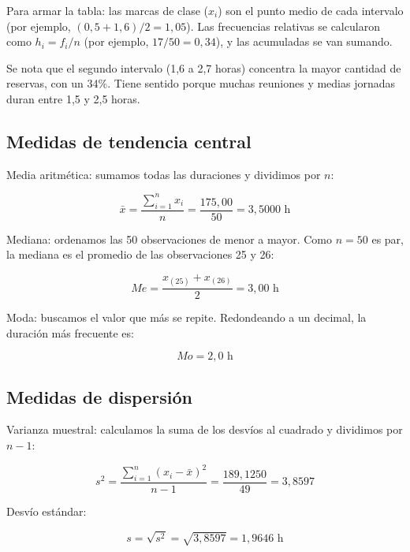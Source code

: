 \documentclass[12pt,a4paper]{article}
\begin{document}
Para armar la tabla: las marcas de clase ($x_i$) son el punto medio de cada intervalo (por ejemplo, $(0{,}5 + 1{,}6)/2 = 1{,}05$). Las frecuencias relativas se calcularon como $h_i = f_i / n$ (por ejemplo, $17/50 = 0{,}34$), y las acumuladas se van sumando.

Se nota que el segundo intervalo (1,6 a 2,7 horas) concentra la mayor cantidad de reservas, con un 34\%. Tiene sentido porque muchas reuniones y medias jornadas duran entre 1,5 y 2,5 horas.

\subsection{Medidas de tendencia central}

Media aritmética: sumamos todas las duraciones y dividimos por $n$:

\vspace{4pt}
$$\bar{x} = \frac{\sum_{i=1}^{n} x_i}{n} = \frac{175{,}00}{50} = 3{,}5000 \text{ h}$$
\vspace{6pt}

Mediana: ordenamos las 50 observaciones de menor a mayor. Como $n = 50$ es par, la mediana es el promedio de las observaciones 25 y 26:

\vspace{4pt}
$$Me = \frac{x_{(25)} + x_{(26)}}{2} = 3{,}00 \text{ h}$$
\vspace{6pt}

Moda: buscamos el valor que más se repite. Redondeando a un decimal, la duración más frecuente es:

\vspace{4pt}
$$Mo = 2{,}0 \text{ h}$$

\subsection{Medidas de dispersión}

Varianza muestral: calculamos la suma de los desvíos al cuadrado y dividimos por $n - 1$:

\vspace{4pt}
$$s^2 = \frac{\sum_{i=1}^{n}(x_i - \bar{x})^2}{n - 1} = \frac{189{,}1250}{49} = 3{,}8597$$
\vspace{6pt}

Desvío estándar:

\vspace{4pt}
$$s = \sqrt{s^2} = \sqrt{3{,}8597} = 1{,}9646 \text{ h}$$
\vspace{6pt}
\end{document}
